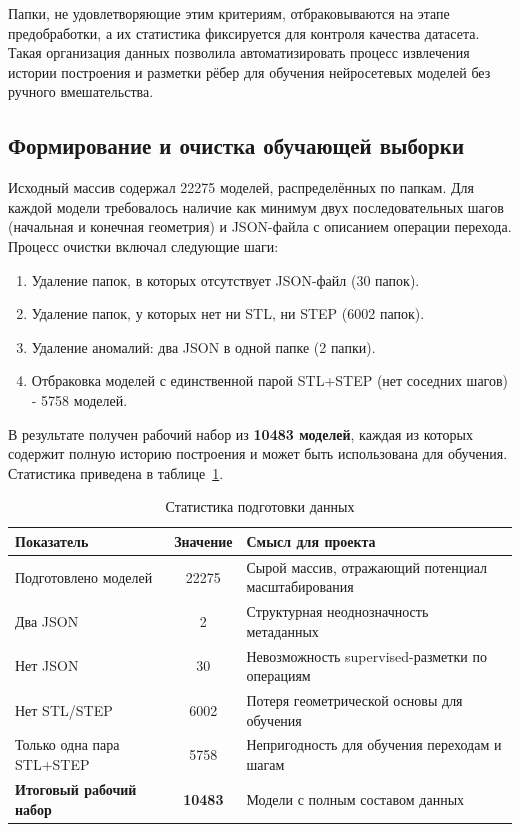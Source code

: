 Папки, не удовлетворяющие этим критериям, отбраковываются на этапе предобработки, а их статистика фиксируется для контроля качества датасета. Такая организация данных позволила автоматизировать процесс извлечения истории построения и разметки рёбер для обучения нейросетевых моделей без ручного вмешательства.

\subsection{Формирование и очистка обучающей выборки}
Исходный массив содержал 22275 моделей, распределённых по папкам. Для каждой модели требовалось наличие как минимум двух последовательных шагов (начальная и конечная геометрия) и JSON-файла с описанием операции перехода. Процесс очистки включал следующие шаги:

\begin{enumerate}
    \item Удаление папок, в которых отсутствует JSON-файл (30 папок).
    \item Удаление папок, у которых нет ни STL, ни STEP (6002 папок).
    \item Удаление аномалий: два JSON в одной папке (2 папки).
    \item Отбраковка моделей с единственной парой STL+STEP (нет соседних шагов) - 5758 моделей.
\end{enumerate}

В результате получен рабочий набор из \textbf{10483 моделей}, каждая из которых содержит полную историю построения и может быть использована для обучения. Статистика приведена в таблице~\ref{tab:data-stats}.

\begin{table}[h]
\centering
\begin{tabular}{|l|c|p{6cm}|}
\hline
\textbf{Показатель} & \textbf{Значение} & \textbf{Смысл для проекта} \\
\hline
Подготовлено моделей & 22275 & Сырой массив, отражающий потенциал масштабирования \\
\hline
Два JSON & 2 & Структурная неоднозначность метаданных \\
\hline
Нет JSON & 30 & Невозможность supervised-разметки по операциям \\
\hline
Нет STL/STEP & 6002 & Потеря геометрической основы для обучения \\
\hline
Только одна пара STL+STEP & 5758 & Непригодность для обучения переходам и шагам \\
\hline
\textbf{Итоговый рабочий набор} & \textbf{10483} & Модели с полным составом данных \\
\hline
\end{tabular}
\caption{Статистика подготовки данных}
\label{tab:data-stats}
\end{table}

